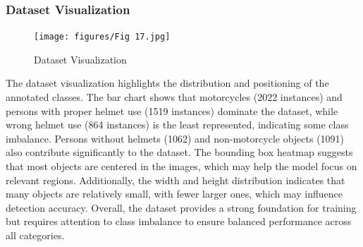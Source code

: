 \begin{refsection}
\subsubsection{Dataset Visualization}
\begin{figure}[ht]
    \centering
	\texttt{[image: figures/Fig 17.jpg]}
	\caption[Dataset Visualization]{Dataset Visualization}
	\label{fig:dataset_visualization}
\end{figure}

\noindent
The dataset visualization highlights the distribution and positioning of the annotated classes. The bar chart shows that motorcycles (2022 instances) and persons with proper helmet use (1519 instances) dominate the dataset, while wrong helmet use (864 instances) is the least represented, indicating some class imbalance. Persons without helmets (1062) and non-motorcycle objects (1091) also contribute significantly to the dataset. The bounding box heatmap suggests that most objects are centered in the images, which may help the model focus on relevant regions. Additionally, the width and height distribution indicates that many objects are relatively small, with fewer larger ones, which may influence detection accuracy. Overall, the dataset provides a strong foundation for training but requires attention to class imbalance to ensure balanced performance across all categories.


\end{refsection}

